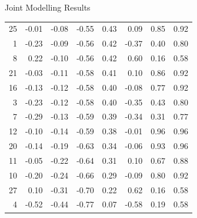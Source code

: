 \documentclass[a4paper,9pt]{beamer}\usepackage[]{graphicx}\usepackage[]{color}
\begin{document}
\begin{frame}{Joint Modelling Results}
\begin{table}[H]
\begin{tabular}{rrrrrrrr}
   25 & -0.01 & -0.08 & -0.55 & 0.43 & 0.09 & 0.85 & 0.92 \\ 
    1 & -0.23 & -0.09 & -0.56 & 0.42 & -0.37 & 0.40 & 0.80 \\ 
    8 & 0.22 & -0.10 & -0.56 & 0.42 & 0.60 & 0.16 & 0.58 \\ 
   21 & -0.03 & -0.11 & -0.58 & 0.41 & 0.10 & 0.86 & 0.92 \\ 
   16 & -0.13 & -0.12 & -0.58 & 0.40 & -0.08 & 0.77 & 0.92 \\ 
    3 & -0.23 & -0.12 & -0.58 & 0.40 & -0.35 & 0.43 & 0.80 \\ 
    7 & -0.29 & -0.13 & -0.59 & 0.39 & -0.34 & 0.31 & 0.77 \\ 
   12 & -0.10 & -0.14 & -0.59 & 0.38 & -0.01 & 0.96 & 0.96 \\ 
   20 & -0.14 & -0.19 & -0.63 & 0.34 & -0.06 & 0.93 & 0.96 \\ 
   11 & -0.05 & -0.22 & -0.64 & 0.31 & 0.10 & 0.67 & 0.88 \\ 
   10 & -0.20 & -0.24 & -0.66 & 0.29 & -0.09 & 0.80 & 0.92 \\ 
   27 & 0.10 & -0.31 & -0.70 & 0.22 & 0.62 & 0.16 & 0.58 \\ 
   \alert{4} & -0.52 & -0.44 & -0.77 & 0.07 & -0.58 & 0.19 & 0.58 \\ 
   \hline
\end{tabular}
\end{table}

\end{frame}
\end{document}
